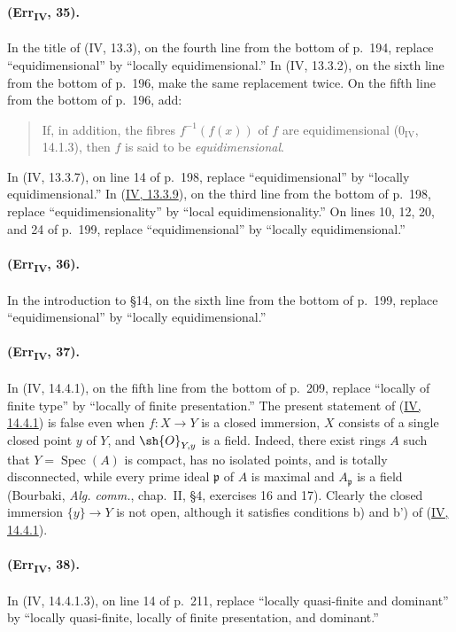 {\paragraph{(Err\textsubscript{IV}, 35).}
In the title of (IV, 13.3), on the fourth line from the bottom of p.~194,
replace ``equidimensional'' by ``locally equidimensional.''  In
(IV, 13.3.2), on the sixth line from the bottom of p.~196, make the same
replacement twice.  On the fifth line from the bottom of p.~196, add:
\begin{quote}
If, in addition, the fibres $f^{-1}(f(x))$ of $f$ are equidimensional
($0_{\mathrm{IV}}$, 14.1.3), then $f$ is said to be
\emph{equidimensional}.
\end{quote}
In (IV, 13.3.7), on line 14 of p.~198, replace ``equidimensional'' by
``locally equidimensional.''  In ({\hyperlink{ega4.c04.statement.13-3-9}{IV, 13.3.9}}), on the third line from
the bottom of p.~198, replace ``equidimensionality'' by ``local
equidimensionality.''  On lines 10, 12, 20, and 24 of p.~199, replace
``equidimensional'' by ``locally equidimensional.''

\paragraph{(Err\textsubscript{IV}, 36).}
In the introduction to \S14, on the sixth line from the bottom of
p.~199, replace ``equidimensional'' by ``locally equidimensional.''

\paragraph{(Err\textsubscript{IV}, 37).}
In (IV, 14.4.1), on the fifth line from the bottom of p.~209, replace
``locally of finite type'' by ``locally of finite presentation.''  The
present statement of ({\hyperlink{ega4.c04.thm.14-4-1}{IV, 14.4.1}}) is false even when $f:X\to Y$ is a
closed immersion, $X$ consists of a single closed point $y$ of $Y$, and
$\sh{O}_{Y,y}$ is a field.  Indeed, there exist rings $A$ such that
$Y=\operatorname{Spec}(A)$ is compact, has no isolated points, and is
totally disconnected, while every prime ideal $\mathfrak p$ of $A$ is
maximal and $A_\mathfrak p$ is a field (Bourbaki,
\emph{Alg. comm.}, chap.~II, \S4, exercises 16 and 17).  Clearly the
closed immersion $\{y\}\to Y$ is not open, although it satisfies
conditions b) and b') of ({\hyperlink{ega4.c04.thm.14-4-1}{IV, 14.4.1}}).

\paragraph{(Err\textsubscript{IV}, 38).}
In (IV, 14.4.1.3), on line 14 of p.~211, replace ``locally quasi-finite
and dominant'' by ``locally quasi-finite, locally of finite presentation,
and dominant.''

}
